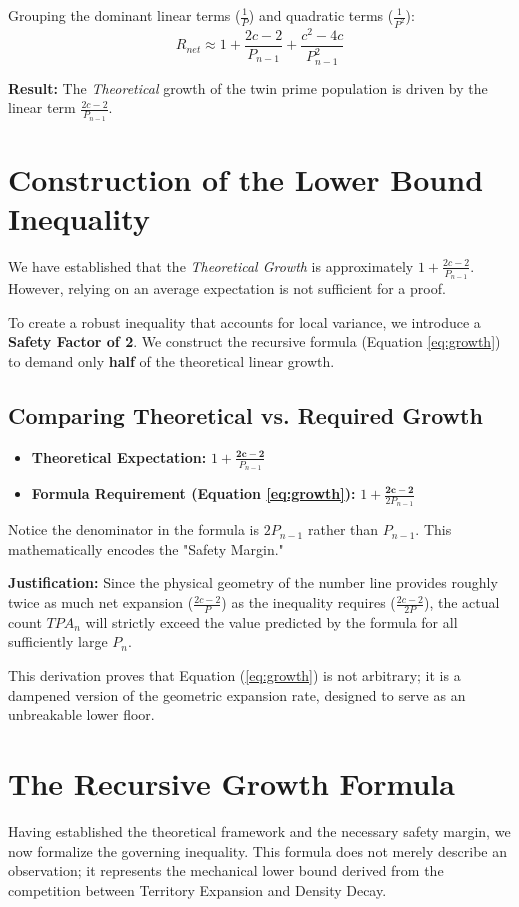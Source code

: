 \documentclass[sn-mathphys-num, pdflatex]{sn-jnl}
\begin{document}
Grouping the dominant linear terms ($\frac{1}{P}$) and quadratic terms ($\frac{1}{P^2}$):
\begin{equation}
    R_{net} \approx 1 + \frac{2c - 2}{P_{n-1}} + \frac{c^2 - 4c}{P_{n-1}^2}
\end{equation}

\textbf{Result:} The \textit{Theoretical} growth of the twin prime population is driven by the linear term $\frac{2c-2}{P_{n-1}}$.

\section{Construction of the Lower Bound Inequality}

We have established that the \textit{Theoretical Growth} is approximately $1 + \frac{2c-2}{P_{n-1}}$. However, relying on an average expectation is not sufficient for a proof.

To create a robust inequality that accounts for local variance, we introduce a \textbf{Safety Factor of 2}. We construct the recursive formula (Equation \ref{eq:growth}) to demand only \textbf{half} of the theoretical linear growth.

\subsection{Comparing Theoretical vs. Required Growth}
\begin{itemize}
    \item \textbf{Theoretical Expectation:} $1 + \frac{\mathbf{2c - 2}}{P_{n-1}}$
    \item \textbf{Formula Requirement (Equation \ref{eq:growth}):} $1 + \frac{\mathbf{2c - 2}}{2P_{n-1}}$
\end{itemize}

Notice the denominator in the formula is $2P_{n-1}$ rather than $P_{n-1}$. This mathematically encodes the "Safety Margin."

\textbf{Justification:}
Since the physical geometry of the number line provides roughly twice as much net expansion ($\frac{2c-2}{P}$) as the inequality requires ($\frac{2c-2}{2P}$), the actual count $TPA_n$ will strictly exceed the value predicted by the formula for all sufficiently large $P_n$.

This derivation proves that Equation (\ref{eq:growth}) is not arbitrary; it is a dampened version of the geometric expansion rate, designed to serve as an unbreakable lower floor.
\section{The Recursive Growth Formula}
Having established the theoretical framework and the necessary safety margin, we now formalize the governing inequality. This formula does not merely describe an observation; it represents the mechanical lower bound derived from the competition between Territory Expansion and Density Decay.
\end{document}
